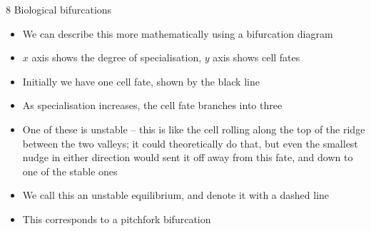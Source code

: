 \documentclass[presentation]{beamer}
\begin{document}
\begin{frame}[label={sec:org233cae7}]{8 Biological bifurcations}
\begin{itemize}
\item We can describe this more mathematically using a bifurcation diagram
\item \(x\) axis shows the degree of specialisation, \(y\) axis shows cell fates
\item Initially we have one cell fate, shown by the black line
\item As specialisation increases, the cell fate branches into three
\item One of these is unstable -- this is like the cell rolling along the top of the ridge between the two valleys; it could theoretically do that, but even the smallest nudge in either direction would sent it off away from this fate, and down to one of the stable ones
\item We call this an unstable equilibrium, and denote it with a dashed line
\item This corresponds to a pitchfork bifurcation
\end{itemize}
\end{frame}
\end{document}
